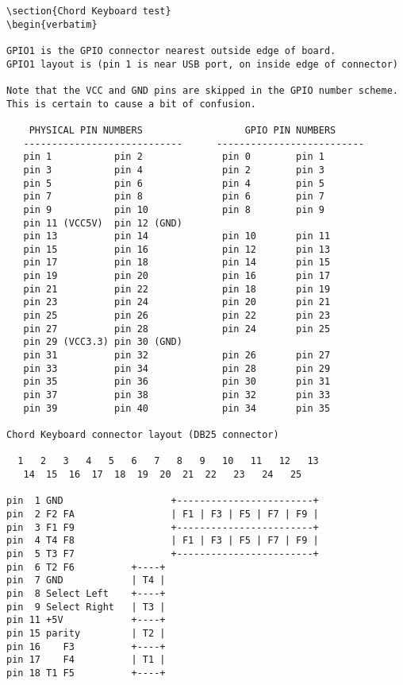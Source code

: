 \documentclass[dvipdfm]{book}
\begin{document}
\begin{verbatim}
\section{Chord Keyboard test}
\begin{verbatim}

GPIO1 is the GPIO connector nearest outside edge of board.
GPIO1 layout is (pin 1 is near USB port, on inside edge of connector)

Note that the VCC and GND pins are skipped in the GPIO number scheme.
This is certain to cause a bit of confusion.

    PHYSICAL PIN NUMBERS                  GPIO PIN NUMBERS
   ----------------------------      --------------------------
   pin 1           pin 2              pin 0        pin 1
   pin 3           pin 4              pin 2        pin 3
   pin 5           pin 6              pin 4        pin 5
   pin 7           pin 8              pin 6        pin 7
   pin 9           pin 10             pin 8        pin 9
   pin 11 (VCC5V)  pin 12 (GND)
   pin 13          pin 14             pin 10       pin 11
   pin 15          pin 16             pin 12       pin 13
   pin 17          pin 18             pin 14       pin 15
   pin 19          pin 20             pin 16       pin 17
   pin 21          pin 22             pin 18       pin 19
   pin 23          pin 24             pin 20       pin 21
   pin 25          pin 26             pin 22       pin 23
   pin 27          pin 28             pin 24       pin 25
   pin 29 (VCC3.3) pin 30 (GND)
   pin 31          pin 32             pin 26       pin 27
   pin 33          pin 34             pin 28       pin 29
   pin 35          pin 36             pin 30       pin 31
   pin 37          pin 38             pin 32       pin 33
   pin 39          pin 40             pin 34       pin 35

Chord Keyboard connector layout (DB25 connector)

  1   2   3   4   5   6   7   8   9   10   11   12   13
   14  15  16  17  18  19  20  21  22   23   24   25

pin  1 GND                   +------------------------+
pin  2 F2 FA                 | F1 | F3 | F5 | F7 | F9 |
pin  3 F1 F9                 +------------------------+
pin  4 T4 F8                 | F1 | F3 | F5 | F7 | F9 |
pin  5 T3 F7                 +------------------------+
pin  6 T2 F6          +----+
pin  7 GND            | T4 |
pin  8 Select Left    +----+
pin  9 Select Right   | T3 |
pin 11 +5V            +----+              
pin 15 parity         | T2 | 
pin 16    F3          +----+  
pin 17    F4          | T1 |
pin 18 T1 F5          +----+   
               

\end{verbatim}
\end{document}

